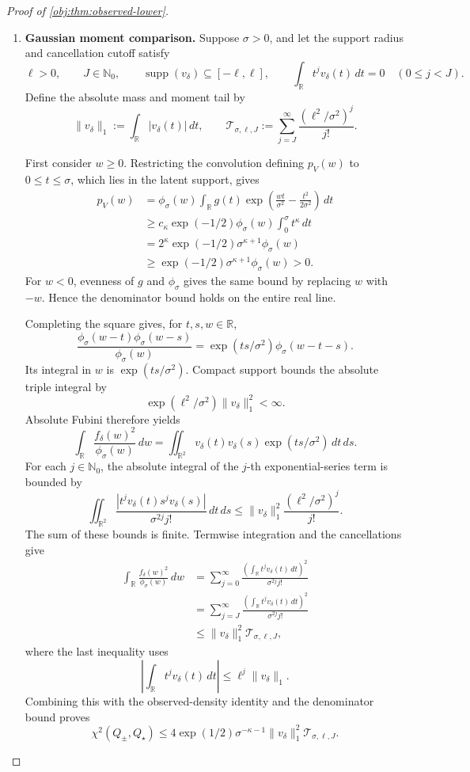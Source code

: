 \begin{proof}[Proof of \cref{obj:thm:observed-lower}]
\begin{enumerate}
\item \textbf{Gaussian moment comparison.}
Suppose \(\sigma>0\), and let the support radius and cancellation cutoff satisfy
\[
\ell>0,\qquad J\in\mathbb N_0,\qquad
\operatorname{supp}(v_\delta)\subseteq[-\ell,\ell],\qquad
\int_{\mathbb R}t^jv_\delta(t)\,dt=0\quad(0\le j<J).
\]
Define the absolute mass and moment tail by
\[
\|v_\delta\|_1:=\int_{\mathbb R}|v_\delta(t)|\,dt,\qquad
\mathcal T_{\sigma,\ell,J}:=
\sum_{j=J}^{\infty}\frac{(\ell^2/\sigma^2)^j}{j!}.
\]

First consider \(w\ge0\). Restricting the convolution defining \(p_V(w)\) to \(0\le t\le\sigma\), which lies in the latent support, gives
\[
\begin{aligned}
p_V(w)
&=\phi_\sigma(w)\int_{\mathbb R}
g(t)\exp\left(\frac{wt}{\sigma^2}-\frac{t^2}{2\sigma^2}\right)\,dt\\
&\ge
c_\kappa\exp(-1/2)\phi_\sigma(w)\int_0^\sigma t^\kappa\,dt\\
&=
2^\kappa\exp(-1/2)\sigma^{\kappa+1}\phi_\sigma(w)\\
&\ge\exp(-1/2)\sigma^{\kappa+1}\phi_\sigma(w)>0.
\end{aligned}
\]
For \(w<0\), evenness of \(g\) and \(\phi_\sigma\) gives the same bound by replacing \(w\) with \(-w\). Hence the denominator bound holds on the entire real line.

Completing the square gives, for \(t,s,w\in\mathbb R\),
\[
\frac{\phi_\sigma(w-t)\phi_\sigma(w-s)}{\phi_\sigma(w)}
=
\exp(ts/\sigma^2)\phi_\sigma(w-t-s).
\]
Its integral in \(w\) is \(\exp(ts/\sigma^2)\). Compact support bounds the absolute triple integral by
\[
\exp(\ell^2/\sigma^2)\|v_\delta\|_1^2<\infty.
\]
Absolute Fubini therefore yields
\[
\int_{\mathbb R}\frac{f_\delta(w)^2}{\phi_\sigma(w)}\,dw
=
\iint_{\mathbb R^2}
v_\delta(t)v_\delta(s)\exp(ts/\sigma^2)\,dt\,ds.
\]
For each \(j\in\mathbb N_0\), the absolute integral of the \(j\)-th exponential-series term is bounded by
\[
\iint_{\mathbb R^2}
\frac{|t^jv_\delta(t)s^jv_\delta(s)|}{\sigma^{2j}j!}\,dt\,ds
\le
\|v_\delta\|_1^2\frac{(\ell^2/\sigma^2)^j}{j!}.
\]
The sum of these bounds is finite. Termwise integration and the cancellations give
\[
\begin{aligned}
\int_{\mathbb R}\frac{f_\delta(w)^2}{\phi_\sigma(w)}\,dw
&=
\sum_{j=0}^{\infty}
\frac{\left(\int_{\mathbb R}t^jv_\delta(t)\,dt\right)^2}
{\sigma^{2j}j!}\\
&=
\sum_{j=J}^{\infty}
\frac{\left(\int_{\mathbb R}t^jv_\delta(t)\,dt\right)^2}
{\sigma^{2j}j!}\\
&\le \|v_\delta\|_1^2\mathcal T_{\sigma,\ell,J},
\end{aligned}
\]
where the last inequality uses
\[
\left|\int_{\mathbb R}t^jv_\delta(t)\,dt\right|
\le\ell^j\|v_\delta\|_1.
\]
Combining this with the observed-density identity and the denominator bound proves
\[
\chi^2(Q_\pm,Q_\star)
\le
4\exp(1/2)\sigma^{-\kappa-1}
\|v_\delta\|_1^2\mathcal T_{\sigma,\ell,J}.
\]


\end{enumerate}
\end{proof}
